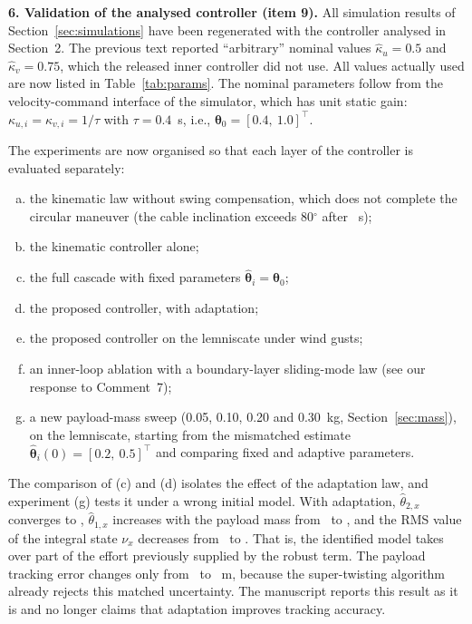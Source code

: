 \begin{reply}
\medskip
\noindent\textbf{6. Validation of the analysed controller (item 9).}
All simulation results of Section~\ref{sec:simulations} have been regenerated with the controller analysed in Section~2. The previous text reported ``arbitrary'' nominal values $\hat{\kappa}_u=0.5$ and $\hat{\kappa}_v=0.75$, which the released inner controller did not use. All values actually used are now listed in Table~\ref{tab:params}. The nominal parameters follow from the velocity-command interface of the simulator, which has unit static gain: $\kappa_{u,i}=\kappa_{v,i}=1/\tau$ with $\tau=0.4$~s, i.e., $\boldsymbol{\theta}_0=[0.4,\ 1.0]^\top$.

The experiments are now organised so that each layer of the controller is evaluated separately:
\begin{enumerate}[(a)]
\item the kinematic law without swing compensation, which does not complete the circular maneuver (the cable inclination exceeds 80$^\circ$ after \XX~s);
\item the kinematic controller alone;
\item the full cascade with fixed parameters $\hat{\boldsymbol{\theta}}_i=\boldsymbol{\theta}_0$;
\item the proposed controller, with adaptation;
\item the proposed controller on the lemniscate under wind gusts;
\item an inner-loop ablation with a boundary-layer sliding-mode law (see our response to Comment~7);
\item a new payload-mass sweep (0.05, 0.10, 0.20 and 0.30~kg, Section~\ref{sec:mass}), on the lemniscate, starting from the mismatched estimate $\hat{\boldsymbol{\theta}}_i(0)=[0.2,\ 0.5]^\top$ and comparing fixed and adaptive parameters.
\end{enumerate}
The comparison of (c) and (d) isolates the effect of the adaptation law, and experiment (g) tests it under a wrong initial model. With adaptation, $\hat\theta_{2,x}$ converges to \XX, $\hat\theta_{1,x}$ increases with the payload mass from \XX\ to \XX, and the RMS value of the integral state $\nu_x$ decreases from \XX\ to \XX. That is, the identified model takes over part of the effort previously supplied by the robust term. The payload tracking error changes only from \XX\ to \XX~m, because the super-twisting algorithm already rejects this matched uncertainty. The manuscript reports this result as it is and no longer claims that adaptation improves tracking accuracy.


\end{reply}
